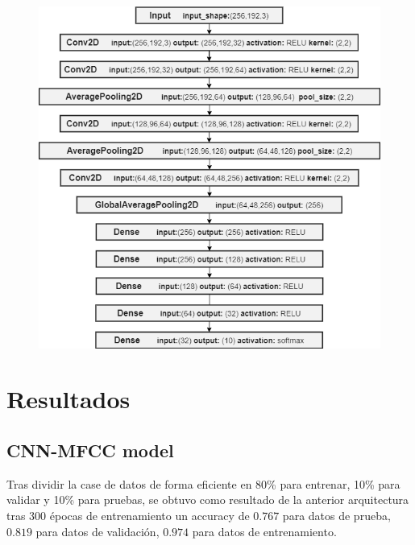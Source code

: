 \documentclass[colorinlistoftodos,twoside,twocolumn,10pt]{article} %
\begin{document}
\begin{figure}
\includegraphics{CNN.png}
\end{figure}

\section{Resultados}
\subsection {CNN-MFCC model}
Tras dividir la case de datos de forma eficiente en 80\% para entrenar, 10\% para validar y 10\% para pruebas, se obtuvo como resultado de la anterior arquitectura tras 300 épocas de entrenamiento un accuracy de $0.767$ para datos de prueba, $0.819$ para datos de validación, $0.974$ para datos de entrenamiento.
\end{document}
